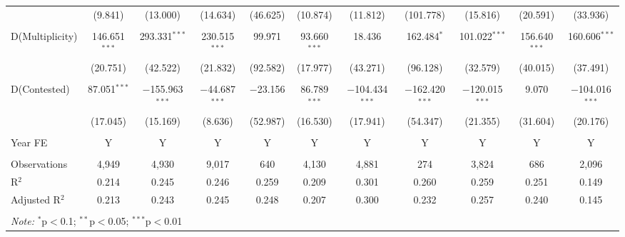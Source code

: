 \documentclass[12pt,a4paper]{article}
\begin{document}
\begin{appendices}
\begin{landscape}
\begin{table}
{\begin{tabular}{lcccccccccc}
 & (9.841) & (13.000) & (14.634) & (46.625) & (10.874) & (11.812) & (101.778) & (15.816) & (20.591) & (33.936) \\ 
 & & & & & & & & & & \\ 
 D(Multiplicity) & 146.651$^{***}$ & 293.331$^{***}$ & 230.515$^{***}$ & 99.971 & 93.660$^{***}$ & 18.436 & 162.484$^{*}$ & 101.022$^{***}$ & 156.640$^{***}$ & 160.606$^{***}$ \\ 
 & (20.751) & (42.522) & (21.832) & (92.582) & (17.977) & (43.271) & (96.128) & (32.579) & (40.015) & (37.491) \\ 
 & & & & & & & & & & \\ 
 D(Contested) & 87.051$^{***}$ & $-$155.963$^{***}$ & $-$44.687$^{***}$ & $-$23.156 & 86.789$^{***}$ & $-$104.434$^{***}$ & $-$162.420$^{***}$ & $-$120.015$^{***}$ & 9.070 & $-$104.016$^{***}$ \\ 
 & (17.045) & (15.169) & (8.636) & (52.987) & (16.530) & (17.941) & (54.347) & (21.355) & (31.604) & (20.176) \\
 \hline \\[-1.8ex]
 Year FE & Y & Y & Y & Y & Y & Y & Y & Y & Y & Y \\
 \hline \\[-1.8ex] 
 Observations & 4,949 & 4,930 & 9,017 & 640 & 4,130 & 4,881 & 274 & 3,824 & 686 & 2,096 \\ 
 R$^{2}$ & 0.214 & 0.245 & 0.246 & 0.259 & 0.209 & 0.301 & 0.260 & 0.259 & 0.251 & 0.149 \\ 
 Adjusted R$^{2}$ & 0.213 & 0.243 & 0.245 & 0.248 & 0.207 & 0.300 & 0.232 & 0.257 & 0.240 & 0.145 \\ 
 \hline \\[-1.8ex] 
 \multicolumn{11}{l}{\textit{Note:} $^{*}$p$<$0.1; $^{**}$p$<$0.05; $^{***}$p$<$0.01} \\ 
 \end{tabular}}
 \end{table}
 \end{landscape}
 

\end{appendices}
\end{document}
